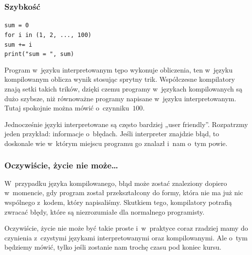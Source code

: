\documentclass[10pt,t]{beamer}
\begin{document}
\begin{frame}
  \frametitle{Szybkość}


  \texttt{sum = 0} \\

  \texttt{for i in (1, 2, ..., 100)} \\
  \hphantom{aaaa} \texttt{sum += i} \\

  \texttt{print("sum = ", sum)}

  Program w~języku interpretowanym tępo wykonuje obliczenia, ten
  w~języku kompilowanym oblicza wynik stosując sprytny trik. Współczesne
  kompilatory znają setki takich trików, dzięki czemu programy w~językach
  kompilowanych są \alert{dużo} szybsze, niż równoważne programy napisane
  w~języku interpretowanym. Tutaj spokojnie można mówić o~czynniku~$100$.

  Jednocześnie języki interpretowane są często bardziej „user friendly”.
  Rozpatrzmy jeden przykład: informacje o~błędach. Jeśli interpreter
  znajdzie błąd, to doskonale wie w~którym miejscu programu go znalazł
  i~nam o~tym powie.

\end{frame}





\begin{frame}
  \frametitle{Oczywiście, życie nie może\ldots}


  W~przypadku języka kompilowanego, błąd może zostać znaleziony dopiero
  w~momencie, gdy program został przekształcony do formy, która
  nie ma już nic wspólnego z~kodem, który napisaliśmy. Skutkiem tego,
  kompilatory potrafią zwracać błędy, które są niezrozumiałe dla normalnego
  programisty.

  Oczywiście, życie nie może być takie proste i~w~praktyce coraz rzadziej
  mamy do czynienia z~czystymi językami interpretowanymi oraz kompilowanymi.
  Ale o~tym będziemy mówić, tylko jeśli zostanie nam trochę czasu pod
  koniec kursu.

\end{frame}







\end{document}
